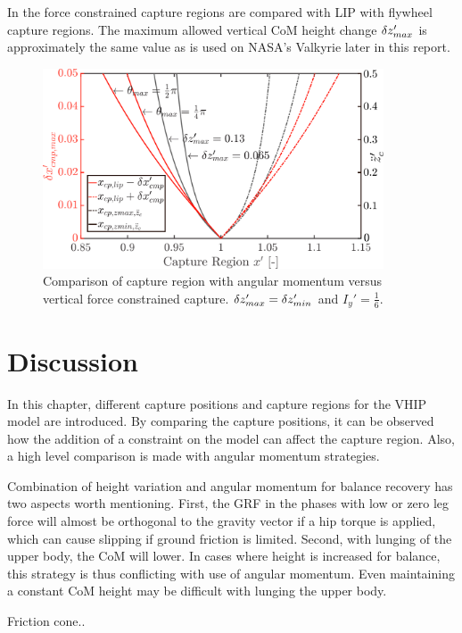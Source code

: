In  the force constrained capture regions are compared with \ac{LIP} with flywheel capture regions. The maximum allowed vertical \ac{CoM} height change $\delta z_{max}'$ is approximately the same value as is used on NASA's Valkyrie later in this report.
\begin{figure}
\centering
\includegraphics[width=0.9\textwidth]{STYLESTUFF/capcompare.png}
\caption{Comparison of capture region with angular momentum versus vertical force constrained capture. $\delta z_{max}' =\delta z_{min}'$ and $I_y' = \frac{1}{6}$.}
\label{fig:capcompare}
\end{figure}

\section{Discussion}
In this chapter, different capture positions and capture regions for the \ac{VHIP} model are introduced. By comparing the capture positions, it can be observed how the addition of a constraint on the model can affect the capture region. Also, a high level comparison is made with angular momentum strategies.

Combination of height variation and angular momentum for balance recovery has two aspects worth mentioning. First, the \ac{GRF} in the phases with low or zero leg force will almost be orthogonal to the gravity vector if a hip torque is applied, which can cause slipping if ground friction is limited. Second, with lunging of the upper body, the \ac{CoM} will lower. In cases where height is increased for balance, this strategy is thus conflicting with use of angular momentum. Even maintaining a constant \ac{CoM} height may be difficult with lunging the upper body.

Friction cone..